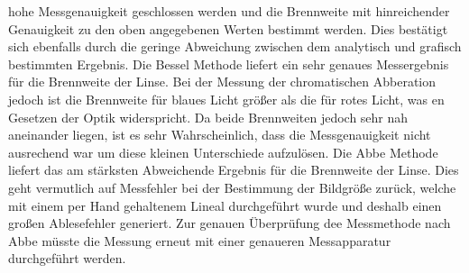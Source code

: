 hohe Messgenauigkeit geschlossen werden und die Brennweite mit hinreichender Genauigkeit zu den oben angegebenen Werten bestimmt werden. Dies bestätigt sich
ebenfalls durch die geringe Abweichung zwischen dem analytisch und grafisch bestimmten Ergebnis.
Die Bessel Methode liefert ein sehr genaues Messergebnis für die Brennweite der Linse. Bei der Messung der chromatischen Abberation jedoch ist die Brennweite für
blaues Licht größer als die für rotes Licht, was en Gesetzen der Optik widerspricht. Da beide Brennweiten jedoch sehr nah aneinander liegen, ist es sehr Wahrscheinlich,
dass die Messgenauigkeit nicht ausrechend war um diese kleinen Unterschiede aufzulösen.
Die Abbe Methode liefert das am stärksten Abweichende Ergebnis für die Brennweite der Linse. Dies geht vermutlich auf Messfehler bei der Bestimmung der Bildgröße
zurück, welche mit einem per Hand gehaltenem Lineal durchgeführt wurde und deshalb einen großen Ablesefehler generiert. Zur genauen Überprüfung dee Messmethode nach Abbe
müsste die Messung erneut mit einer genaueren Messapparatur durchgeführt werden.
